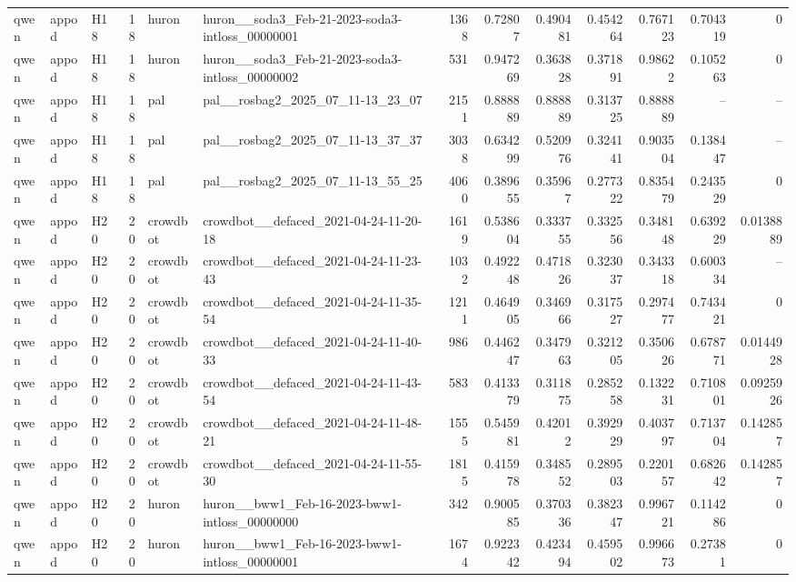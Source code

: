\begin{longtable}{lllrllrrrrrrr}
qwen & appod & H18 & 18 & huron & huron\_\_soda3\_Feb-21-2023-soda3-intloss\_00000001 & 1368 & 0.72807 & 0.490481 & 0.454264 & 0.767123 & 0.704319 & 0 \\
qwen & appod & H18 & 18 & huron & huron\_\_soda3\_Feb-21-2023-soda3-intloss\_00000002 & 531 & 0.947269 & 0.363828 & 0.371891 & 0.98622 & 0.105263 & 0 \\
qwen & appod & H18 & 18 & pal & pal\_\_rosbag2\_2025\_07\_11-13\_23\_07 & 2151 & 0.888889 & 0.888889 & 0.313725 & 0.888889 & -- & -- \\
qwen & appod & H18 & 18 & pal & pal\_\_rosbag2\_2025\_07\_11-13\_37\_37 & 3038 & 0.634299 & 0.520976 & 0.324141 & 0.903504 & 0.138447 & -- \\
qwen & appod & H18 & 18 & pal & pal\_\_rosbag2\_2025\_07\_11-13\_55\_25 & 4060 & 0.389655 & 0.35967 & 0.277322 & 0.835479 & 0.243529 & 0 \\
qwen & appod & H20 & 20 & crowdbot & crowdbot\_\_defaced\_2021-04-24-11-20-18 & 1619 & 0.538604 & 0.333755 & 0.332556 & 0.348148 & 0.639229 & 0.0138889 \\
qwen & appod & H20 & 20 & crowdbot & crowdbot\_\_defaced\_2021-04-24-11-23-43 & 1032 & 0.492248 & 0.471826 & 0.323037 & 0.343318 & 0.600334 & -- \\
qwen & appod & H20 & 20 & crowdbot & crowdbot\_\_defaced\_2021-04-24-11-35-54 & 1211 & 0.464905 & 0.346966 & 0.317527 & 0.297477 & 0.743421 & 0 \\
qwen & appod & H20 & 20 & crowdbot & crowdbot\_\_defaced\_2021-04-24-11-40-33 & 986 & 0.446247 & 0.347963 & 0.321205 & 0.350626 & 0.678771 & 0.0144928 \\
qwen & appod & H20 & 20 & crowdbot & crowdbot\_\_defaced\_2021-04-24-11-43-54 & 583 & 0.413379 & 0.311875 & 0.285258 & 0.132231 & 0.710801 & 0.0925926 \\
qwen & appod & H20 & 20 & crowdbot & crowdbot\_\_defaced\_2021-04-24-11-48-21 & 1555 & 0.545981 & 0.42012 & 0.392929 & 0.403797 & 0.713704 & 0.142857 \\
qwen & appod & H20 & 20 & crowdbot & crowdbot\_\_defaced\_2021-04-24-11-55-30 & 1815 & 0.415978 & 0.348552 & 0.289503 & 0.220157 & 0.682642 & 0.142857 \\
qwen & appod & H20 & 20 & huron & huron\_\_bww1\_Feb-16-2023-bww1-intloss\_00000000 & 342 & 0.900585 & 0.370336 & 0.382347 & 0.996721 & 0.114286 & 0 \\
qwen & appod & H20 & 20 & huron & huron\_\_bww1\_Feb-16-2023-bww1-intloss\_00000001 & 1674 & 0.922342 & 0.423494 & 0.459502 & 0.996673 & 0.27381 & 0 \\

\end{longtable}
